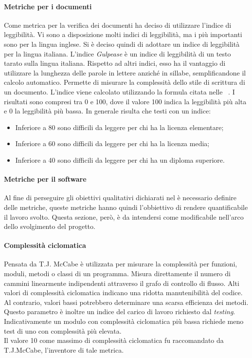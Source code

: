 \paragraph{Metriche per i documenti}
Come metrica per la verifica dei documenti \gruppo ha deciso di utilizzare l’indice di leggibilità.
Vi sono a disposizione molti indici di leggibilità, ma i più importanti sono per la lingua inglese. Si è deciso quindi di adottare un indice di leggibilità per la lingua italiana.
L’indice \textit{Gulpease} è un indice di leggibilità di un testo tarato sulla lingua italiana. Rispetto ad altri indici, esso ha il vantaggio di utilizzare la lunghezza delle parole in lettere anziché in sillabe, semplificandone il calcolo automatico. Permette di misurare la complessità dello stile di scrittura di un documento.
L’indice viene calcolato utilizzando la formula citata nelle \infoNDP~.
I risultati sono compresi tra 0 e 100, dove il valore 100 indica la leggibilità più alta e 0 la leggibilità più bassa. In generale risulta che testi con un indice:
\begin{itemize}
\item Inferiore a 80 sono difficili da leggere per chi ha la licenza elementare;
\item Inferiore a 60 sono difficili da leggere per chi ha la licenza media;
\item Inferiore a 40 sono difficili da leggere per chi ha un diploma superiore.
\end{itemize}

\paragraph{Metriche per il software}
Al fine di perseguire gli obiettivi qualitativi dichiarati nel \PianoDiQualifica{} è necessario definire delle metriche, queste metriche hanno quindi l'obbiettivo di rendere quantificabile il lavoro svolto. Questa sezione, però, è da intendersi come modificabile nell'arco dello svolgimento del progetto.
\paragraph{Complessità ciclomatica}
Pensata da T.J. McCabe è utilizzata per misurare la complessità per funzioni, moduli, metodi o classi di un programma. Misura direttamente il numero di cammini linearmente indipendenti attraverso il grafo di controllo di flusso.
Alti valori di complessità ciclomatica indicano una ridotta manutenibilità del codice. Al contrario, valori bassi potrebbero determinare una scarsa efficienza dei metodi. Questo parametro è inoltre un indice del carico di lavoro richiesto dal \textit{testing}. Indicativamente un modulo con complessità ciclomatica più bassa richiede meno test di uno con complessità più elevata.\\
Il valore 10 come massimo di complessità ciclomatica fu raccomandato da T.J.McCabe, l'inventore di tale metrica.
